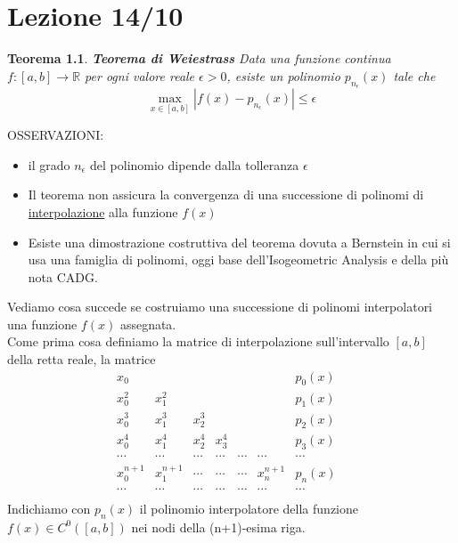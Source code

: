 \documentclass[a4paper, portrait]{book}
\numberwithin{equation}{chapter} %
\newtheorem{theorem}{Teorema}
\begin{document}
\chapter{Lezione 14/10}
\begin{theorem}
    \textbf{Teorema di Weiestrass}
    Data una funzione continua $f: [a,b] \rightarrow \mathbb{R}$ per ogni valore reale $\epsilon > 0$, esiste un polinomio $p_{n_{\epsilon}}(x)$ tale che
    \begin{equation}
        \max_{x \in [a,b]}|f(x) - p_{n_{\epsilon}}(x)|\leq \epsilon
    \end{equation}
\end{theorem}
OSSERVAZIONI:
\begin{itemize}
    \item il grado $n_{\epsilon}$ del polinomio dipende dalla tolleranza $\epsilon$
    \item Il teorema non assicura la convergenza di una successione di polinomi di \underline{interpolazione} alla funzione $f(x)$
    \item Esiste una dimostrazione costruttiva del teorema dovuta a Bernstein in cui si usa una famiglia di polinomi, oggi base dell'Isogeometric Analysis e della più nota CADG.\\
\end{itemize}
Vediamo cosa succede se costruiamo una successione di polinomi interpolatori una funzione $f(x)$ assegnata.\\
Come prima cosa definiamo la matrice di interpolazione sull'intervallo $[a,b]$ della retta reale, la matrice
\begin{equation}
    \begin{matrix}
        x_0&&&&&&p_0(x)\\
        x_0^2&x_1^2&&&&&p_1(x)\\
        x_0^3&x_1^3&x_2^3&&&&p_2(x)\\
        x_0^4&x_1^4&x_2^4&x_3^4&&&p_3(x)\\
        \cdots&\cdots&\cdots&\cdots&\cdots&\cdots&\cdots&\\
        x_0^{n+1}&x_1^{n+1}&\cdots&\cdots&\cdots&x_n^{n+1}&p_n(x)\\
        \cdots&\cdots&\cdots&\cdots&\cdots&\cdots&\cdots&\\
    \end{matrix}
\end{equation}
Indichiamo con $p_n(x)$ il polinomio interpolatore della funzione $f(x) \in C^0 ([a,b])$ nei nodi della (n+1)-esima riga.\\
\end{document}
